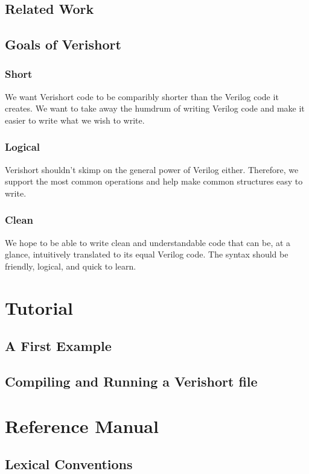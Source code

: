 \documentclass[letterpaper,11pt]{article}
\begin{document}
    \subsection{Related Work}
        \subsection{Goals of Verishort}
        \subsubsection{Short}
        We want Verishort code to be comparibly shorter than the Verilog code it creates. We want to
        take away the humdrum of writing Verilog code and make it easier to write what we wish to write. 
        \subsubsection{Logical}
        Verishort shouldn't skimp on the general power of Verilog either. Therefore, we support the most
        common operations and help make common structures easy to write. 
        \subsubsection{Clean}
        We hope to be able to write clean and understandable code that can be, at a glance, intuitively 
        translated to its equal Verilog code. The syntax should be friendly, logical, and quick to learn.



\section{Tutorial}
    \subsection{A First Example}
    \subsection{Compiling and Running a Verishort file}

\section{Reference Manual}
    \subsection{Lexical Conventions}
\end{document}
